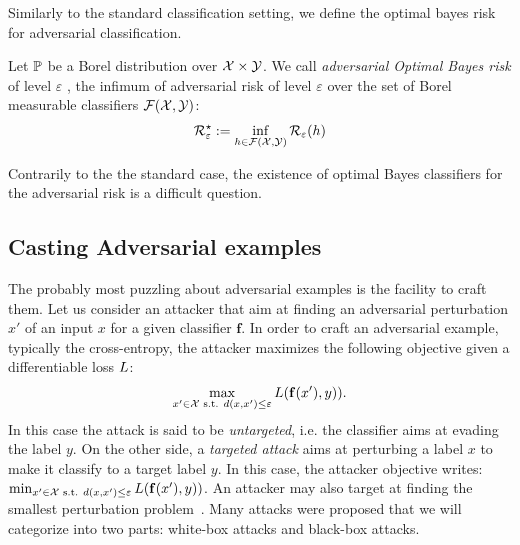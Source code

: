Similarly to the standard classification setting, we define the optimal bayes risk for adversarial classification. 

\begin{definition}
  Let $\mathbb{P}$ be a Borel distribution over $\mathcal{X} \times \mathcal{Y}$. We call \emph{adversarial Optimal Bayes risk} of level $\varepsilon$ , the infimum of adversarial risk of level $\varepsilon$  over the set of Borel measurable classifiers $\mathcal{F}(\mathcal{X},\mathcal{Y})$:
\begin{align*}
  \mathcal{R}^\star_\varepsilon:=\inf_{h\in\mathcal{F}(\mathcal{X},\mathcal{Y})} \mathcal{R}_\varepsilon(h)
\end{align*}

\end{definition}

Contrarily to the the standard case, the existence of optimal Bayes classifiers for the adversarial risk is a difficult question.


\subsection{Casting Adversarial examples}

The probably most puzzling about adversarial examples is the facility to craft them. Let us consider an attacker that aim at finding an adversarial perturbation $x'$ of an input $x$ for a given classifier $\mathbf{f}$.  In order to craft an adversarial example, typically the cross-entropy, the attacker maximizes the following objective given a differentiable loss $L$:
\begin{align}
    \max_{x'\in\XX\text{ s.t. } d(x,x')\leq \varepsilon}\loss\left(\mathbf{f}(x'), y)\right).
\end{align}
In this case the attack is said to be \emph{untargeted}, i.e. the classifier aims at evading the label $y$. On the other side, a \emph{targeted attack} aims at perturbing a label $x$ to make it classify to a target label $y$. In this case, the attacker objective writes: $\min_{x'\in\XX\text{ s.t. } d(x,x')\leq \varepsilon}\loss\left(\mathbf{f}(x'), y)\right)$. An attacker may also target at finding the smallest perturbation problem~\citep{moosavi2016deepfool,carlini2017towards}.  Many attacks were proposed that we will categorize into two parts: white-box attacks and black-box attacks.
